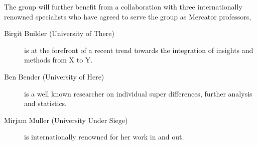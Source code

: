 The group will further benefit from a collaboration with three
internationally renowned specialists who have agreed to serve the group
as Mercator professors, \blindtext

\begin{description}
\item[Birgit Builder (University of There)]
  is at the forefront of a recent trend towards the integration of
  insights and methods from X to Y.
\item[Ben Bender (University of Here)] is a well known
  researcher on individual super differences, further analysis and
  statistics.
\item[Mirjam Muller (University Under Siege)] is
  internationally renowned for her work in and out.
\end{description}






